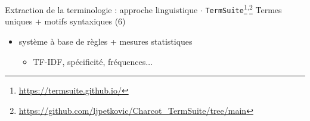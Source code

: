 \begin{frame}{Extraction de la terminologie : approche linguistique $\cdot$ \texttt{TermSuite}\footnote{\url{https://termsuite.github.io/}}\textsuperscript{,}\footnote{\url{https://github.com/ljpetkovic/Charcot\_TermSuite/tree/main}}}
		Termes uniques + motifs syntaxiques (6)
		\begin{itemize}
			\item système à base de règles + mesures statistiques
			\begin{itemize}
				\item \textsc{TF-IDF}, spécificité, fréquences$\dots$

\end{itemize}
\end{itemize}
\end{frame}
